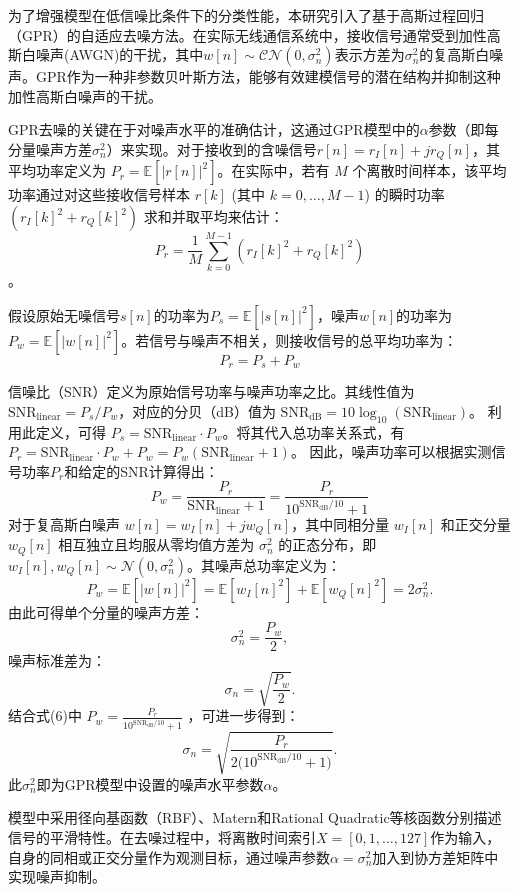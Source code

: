\documentclass[conference]{IEEEtran}
\begin{document}
为了增强模型在低信噪比条件下的分类性能，本研究引入了基于高斯过程回归（GPR）的自适应去噪方法。在实际无线通信系统中，接收信号通常受到加性高斯白噪声(AWGN)的干扰，其中$w[n] \sim \mathcal{CN}(0, \sigma_n^2)$表示方差为$\sigma_n^2$的复高斯白噪声。GPR作为一种非参数贝叶斯方法，能够有效建模信号的潜在结构并抑制这种加性高斯白噪声的干扰。

GPR去噪的关键在于对噪声水平的准确估计，这通过GPR模型中的$\alpha$参数（即每分量噪声方差$\sigma_n^2$）来实现。对于接收到的含噪信号$r[n]=r_I[n]+jr_Q[n]$，其平均功率定义为 $P_r = \mathbb{E}[|r[n]|^2]$。在实际中，若有 $M$ 个离散时间样本，该平均功率通过对这些接收信号样本 $r[k]$ (其中 $k=0, \ldots, M-1$) 的瞬时功率 $(r_I[k]^2 + r_Q[k]^2)$ 求和并取平均来估计：
$$P_r = \frac{1}{M}\sum_{k=0}^{M-1}(r_I[k]^2+r_Q[k]^2)$$。

假设原始无噪信号$s[n]$的功率为$P_s = \mathbb{E}[|s[n]|^2]$，噪声$w[n]$的功率为$P_w = \mathbb{E}[|w[n]|^2]$。若信号与噪声不相关，则接收信号的总平均功率为：
\begin{equation}
P_r = P_s + P_w
\end{equation}

信噪比（SNR）定义为原始信号功率与噪声功率之比。其线性值为$\mathrm{SNR}_{\text{linear}} = P_s/P_w$，对应的分贝（dB）值为 $\mathrm{SNR}_{\text{dB}} = 10\log_{10}(\mathrm{SNR}_{\text{linear}})$。
利用此定义，可得 $P_s = \mathrm{SNR}_{\text{linear}} \cdot P_w$。将其代入总功率关系式，有 $P_r = \mathrm{SNR}_{\text{linear}} \cdot P_w + P_w = P_w(\mathrm{SNR}_{\text{linear}} + 1)$。
因此，噪声功率可以根据实测信号功率$P_r$和给定的SNR计算得出：
\begin{equation}
P_w = \frac{P_r}{\mathrm{SNR}_{\text{linear}} + 1} = \frac{P_r}{10^{\mathrm{SNR}_{\text{dB}}/10} + 1}
\end{equation}
对于复高斯白噪声 $w[n]=w_I[n]+jw_Q[n]$，其中同相分量 $w_I[n]$ 和正交分量 $w_Q[n]$ 相互独立且均服从零均值方差为 $\sigma_n^2$ 的正态分布，即 $w_I[n],w_Q[n]\sim\mathcal{N}(0,\sigma_n^2)$。其噪声总功率定义为：
\[
P_w=\mathbb{E}[|w[n]|^2]
=\mathbb{E}[w_I[n]^2]+\mathbb{E}[w_Q[n]^2]
=2\sigma_n^2.
\]
由此可得单个分量的噪声方差：
\[
\sigma_n^2=\frac{P_w}{2},
\]
噪声标准差为：
\[
\sigma_n=\sqrt{\frac{P_w}{2}}.
\]
结合式(6)中 $P_w=\frac{P_r}{10^{\mathrm{SNR}_{\mathrm{dB}}/10}+1}$ ，可进一步得到：
\[
\sigma_n=\sqrt{\frac{P_r}{2\bigl(10^{\mathrm{SNR}_{\mathrm{dB}}/10}+1\bigr)}}.
\]
\label{eq:sigma_n_calc}
此$\sigma_n^2$即为GPR模型中设置的噪声水平参数$\alpha$。

模型中采用径向基函数（RBF）、Matern和Rational Quadratic等核函数分别描述信号的平滑特性。在去噪过程中，将离散时间索引$X=[0,1,\ldots,127]$作为输入，自身的同相或正交分量作为观测目标，通过噪声参数$\alpha=\sigma_n^2$加入到协方差矩阵中实现噪声抑制。
\end{document}
